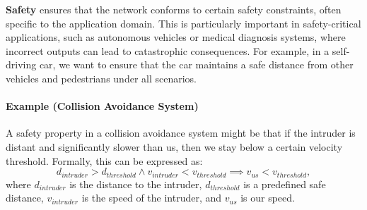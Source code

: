 \documentclass[oneside,11pt,dvipsnames]{book}
\begin{document}
\textbf{Safety} ensures that the network conforms to certain safety constraints, often specific to the application domain. This is particularly important in safety-critical applications, such as autonomous vehicles or medical diagnosis systems, where incorrect outputs can lead to catastrophic consequences. For example, in a self-driving car, we want to ensure that the car maintains a safe distance from other vehicles and pedestrians under all scenarios.

\paragraph{Example (Collision Avoidance System)} A safety property in a collision avoidance system might be that if the intruder is distant and significantly slower than us, then we stay below a certain velocity threshold. Formally, this can be expressed as:
\[
d_{intruder} > d_{threshold} \land v_{intruder} < v_{threshold} \implies v_{us} < v_{threshold},
\]
where $d_{intruder}$ is the distance to the intruder, $d_{threshold}$ is a predefined safe distance, $v_{intruder}$ is the speed of the intruder, and $v_{us}$ is our speed.





\end{document}
